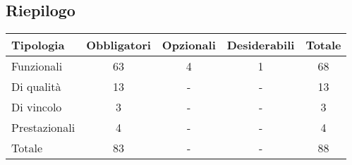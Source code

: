 \subsection{Riepilogo}
\begin{tabular}{|l|c|c|c|c|}
    \hline
    \textbf{Tipologia} & \textbf{Obbligatori} & \textbf{Opzionali} & \textbf{Desiderabili} & \textbf{Totale} \\
    \hline
    Funzionali & 63 & 4 & 1 & 68 \\
    \hline
    Di qualità & 13 & - & - & 13 \\
    \hline
    Di vincolo & 3 & - & - & 3 \\
    \hline
    Prestazionali & 4 & - & - & 4 \\
    \hline
    Totale & 83 & - & - & 88 \\
    \hline
\end{tabular}
